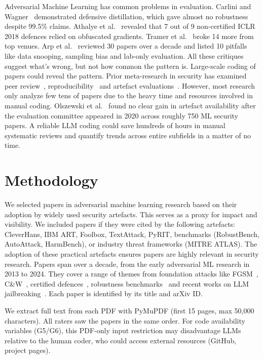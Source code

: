 \documentclass[conference,compsoc]{IEEEtran}
\begin{document}
Adversarial Machine Learning has common problems in evaluation. Carlini and Wagner~\cite{carlini2017towards} demonstrated defensive distillation, which gave almost no robustness despite 99.5\% claims. Athalye et al.~\cite{athalye2018obfuscated} revealed that 7 out of 9 non-certified ICLR 2018 defences relied on obfuscated gradients. Tramer et al.~\cite{tramer2020adaptive} broke 14 more from top venues. Arp et al.~\cite{arp2022dos} reviewed 30 papers over a decade and listed 10 pitfalls like data snooping, sampling bias and lab-only evaluation. All these critiques suggest what's wrong, but not how common the pattern is. Large-scale coding of papers could reveal the pattern. Prior meta-research in security has examined peer review~\cite{soneji2024reflecting}, reproducibility~\cite{olszewski2023reproducibility} and artefact evaluations~\cite{baset2019analyzing}. However, most research only analyze few tens of papers due to the heavy time and resources involved in manual coding. Olszewski et al.~\cite{olszewski2023reproducibility} found no clear gain in artefact availability after the evaluation committee appeared in 2020 across roughly 750 ML security papers. A reliable LLM coding could save hundreds of hours in manual systematic reviews and quantify trends across entire subfields in a matter of no time.

\section{Methodology}

We selected papers in adversarial machine learning research based on their adoption by widely used security artefacts. This serves as a proxy for impact and visibility. We included papers if they were cited by the following artefacts: CleverHans, IBM ART, Foolbox, TextAttack, PyRIT, benchmarks (RobustBench, AutoAttack, HarmBench), or industry threat frameworks (MITRE ATLAS). The adoption of these practical artefacts ensures papers are highly relevant in security research. Papers span over a decade, from the early adversarial ML research in 2013 to 2024. They cover a range of themes from foundation attacks like FGSM~\cite{goodfellow2014explaining}, C\&W~\cite{carlini2017towards}, certified defences~\cite{cohen2019certified}, robustness benchmarks~\cite{croce2020reliable} and recent works on LLM jailbreaking~\cite{zou2023universal}. Each paper is identified by its title and arXiv ID.

We extract full text from each PDF with PyMuPDF (first 15 pages, max 50,000 characters). All raters saw the papers in the same order. For code availability variables (G5/G6), this PDF-only input restriction may disadvantage LLMs relative to the human coder, who could access external resources (GitHub, project pages).
\end{document}
